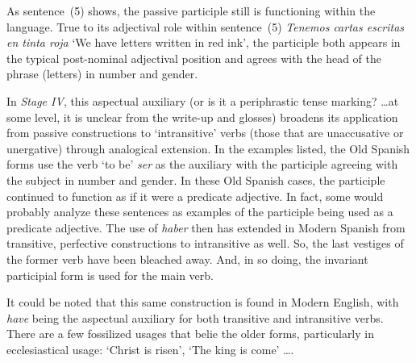 \documentclass[12pt]{article}
\begin{document}
As sentence~(5) shows, the passive participle still is functioning within the language. True to its adjectival role within sentence~(5) {\it Tenemos cartas escritas en tinta roja} `We have letters written in red ink', the participle both appears in the typical post-nominal adjectival position and agrees with the head of the phrase (letters) in number and gender.

In {\it Stage IV}, this aspectual auxiliary (or is it a periphrastic tense marking? \ldots at some level, it is unclear from the write-up and glosses) broadens its application from passive constructions to `intransitive' verbs (those that are unaccusative or unergative) through analogical extension. In the examples listed, the Old Spanish forms use the verb `to be' {\it ser} as the auxiliary with the participle agreeing with the subject in number and gender. In these Old Spanish cases, the participle continued to function as if it were a predicate adjective. In fact, some would probably analyze these sentences as examples of the participle being used as a predicate adjective. The use of {\it haber} then has extended in Modern Spanish from transitive, perfective constructions to intransitive as well. So, the last vestiges of the former verb have been bleached away. And, in so doing, the invariant participial form is used for the main verb. 

It could be noted that this same construction is found in Modern English, with {\it have} being the aspectual auxiliary for both transitive and intransitive verbs. There are a few fossilized usages that belie the older forms, particularly in ecclesiastical usage: `Christ is risen', `The king is come' \ldots.
\end{document}
